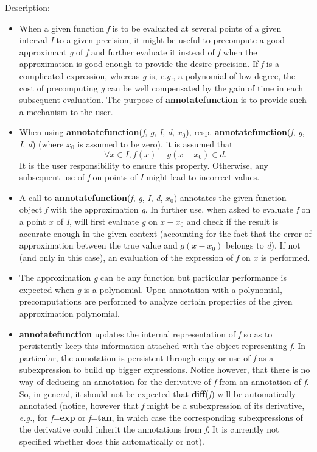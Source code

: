 \noindent Description: \begin{itemize}

\item When a given function \emph{f} is to be evaluated at several points of a given
   interval \emph{I} to a given precision, it might be useful to precompute a good
   approximant \emph{g} of \emph{f} and further evaluate it instead of \emph{f} when the
   approximation is good enough to provide the desire precision. If \emph{f} is a
   complicated expression, whereas \emph{g} is, \emph{e.g.}, a polynomial of low degree,
   the cost of precomputing \emph{g} can be well compensated by the gain of time in
   each subsequent evaluation. The purpose of \textbf{annotatefunction} is to provide
   such a mechanism to the user.

\item When using \textbf{annotatefunction}(\emph{f}, \emph{g}, \emph{I}, \emph{d}, \emph{$x_0$}),
   resp. \textbf{annotatefunction}(\emph{f}, \emph{g}, \emph{I}, \emph{d}) (where \emph{$x_0$} is assumed to be
   zero), it is assumed that
   $$\forall x \in I, f(x) - g(x - x_0) \in d.$$
   It is the user responsibility to ensure this property. Otherwise, any
   subsequent use of \emph{f} on points of \emph{I} might lead to incorrect values.

\item A call to \textbf{annotatefunction}(\emph{f}, \emph{g}, \emph{I}, \emph{d}, \emph{$x_0$}) annotates the given
   \sollya function object \emph{f} with the approximation \emph{g}. In further use, when
   asked to evaluate \emph{f} on a point $x$ of \emph{I}, \sollya will first evaluate \emph{g}
   on $x-x_0$ and check if the result is accurate enough in the given context
   (accounting for the fact that the error of approximation between the true
   value and $g(x-x_0)$ belongs to \emph{d}). If not (and only in this case), an
   evaluation of the expression of \emph{f} on $x$ is performed.

\item The approximation \emph{g} can be any \sollya function but particular
   performance is expected when \emph{g} is a polynomial. Upon annotation with a
   polynomial, precomputations are performed to analyze certain properties of
   the given approximation polynomial.

\item \textbf{annotatefunction} updates the internal representation of \emph{f} so as to
   persistently keep this information attached with the \sollya object
   representing \emph{f}. In particular, the annotation is persistent through copy
   or use of \emph{f} as a subexpression to build up bigger expressions. Notice
   however, that there is no way of deducing an annotation for the derivative
   of \emph{f} from an annotation of \emph{f}. So, in general, it should not be expected
   that \textbf{diff}(\emph{f}) will be automatically annotated (notice, however that \emph{f}
   might be a subexpression of its derivative, \emph{e.g.}, for \emph{f}=\textbf{exp} or \emph{f}=\textbf{tan}, in
   which case the corresponding subexpressions of the derivative could inherit
   the annotations from \emph{f}. It is currently not specified whether \sollya does
   this automatically or not).


\end{itemize}
